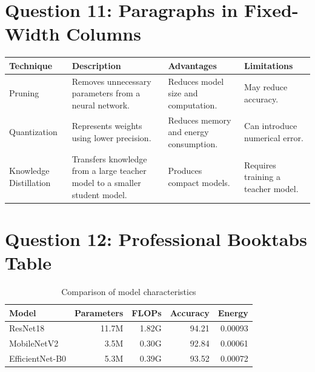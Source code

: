 \documentclass[11pt,a4paper]{article}
\begin{document}
\section*{Question 11: Paragraphs in Fixed-Width Columns}
\small
\begin{center}
\begin{tabularx}{\textwidth}{
|>{\raggedright\arraybackslash}p{}
|>{\raggedright\arraybackslash}X
|>{\raggedright\arraybackslash}X
|>{\raggedright\arraybackslash}X|}
\hline
\textbf{Technique}&\textbf{Description}&
\textbf{Advantages}&\textbf{Limitations}\\ \hline
Pruning&
Removes unnecessary parameters from a neural network.&
Reduces model size and computation.&
May reduce accuracy.\\ \hline
Quantization&
Represents weights using lower precision.&
Reduces memory and energy consumption.&
Can introduce numerical error.\\ \hline
Knowledge Distillation&
Transfers knowledge from a large teacher model to a smaller student model.&
Produces compact models.&
Requires training a teacher model.\\ \hline
\end{tabularx}
\end{center}
\normalsize

\section*{Question 12: Professional Booktabs Table}
\begin{table}[htbp]
\centering
\caption{Comparison of model characteristics}
\label{tab:model-comparison}
\begin{tabular}{lrrrr}
\toprule
Model&Parameters&FLOPs&Accuracy&Energy\\
\midrule
ResNet18&11.7M&1.82G&94.21&0.00093\\
MobileNetV2&3.5M&0.30G&92.84&0.00061\\
EfficientNet-B0&5.3M&0.39G&93.52&0.00072\\
\bottomrule
\end{tabular}
\end{table}
\end{document}
